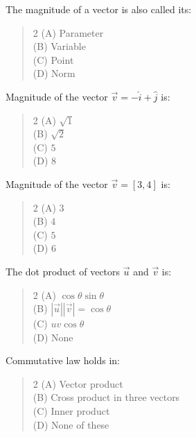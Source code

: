 \documentclass[11pt,a4paper]{article}
\begin{document}
\begin{mcqlist}
\item The magnitude of a vector is also called its:
\begin{quote}\begin{multicols}{2}
\noindent (A) Parameter \\
(B) Variable \\
(C) Point \\
(D) Norm
\end{multicols}\end{quote}

\item Magnitude of the vector $\vec{v}=-\hat{i}+\hat{j}$ is:
\begin{quote}\begin{multicols}{2}
\noindent (A) $\sqrt{1}$ \\
(B) $\sqrt{2}$ \\
(C) $5$ \\
(D) $8$
\end{multicols}\end{quote}

\item Magnitude of the vector $\vec{v}=[3,4]$ is:
\begin{quote}\begin{multicols}{2}
\noindent (A) $3$ \\
(B) $4$ \\
(C) $5$ \\
(D) $6$
\end{multicols}\end{quote}

\item The dot product of vectors $\vec{u}$ and $\vec{v}$ is:
\begin{quote}\begin{multicols}{2}
\noindent (A) $\cos\theta\sin\theta$ \\
(B) $|\vec{u}||\vec{v}|=\cos\theta$ \\
(C) $uv\cos\theta$ \\
(D) None
\end{multicols}\end{quote}

\item Commutative law holds in:
\begin{quote}\begin{multicols}{2}
\noindent (A) Vector product \\
(B) Cross product in three vectors \\
(C) Inner product \\
(D) None of these
\end{multicols}\end{quote}


\end{mcqlist}
\end{document}

